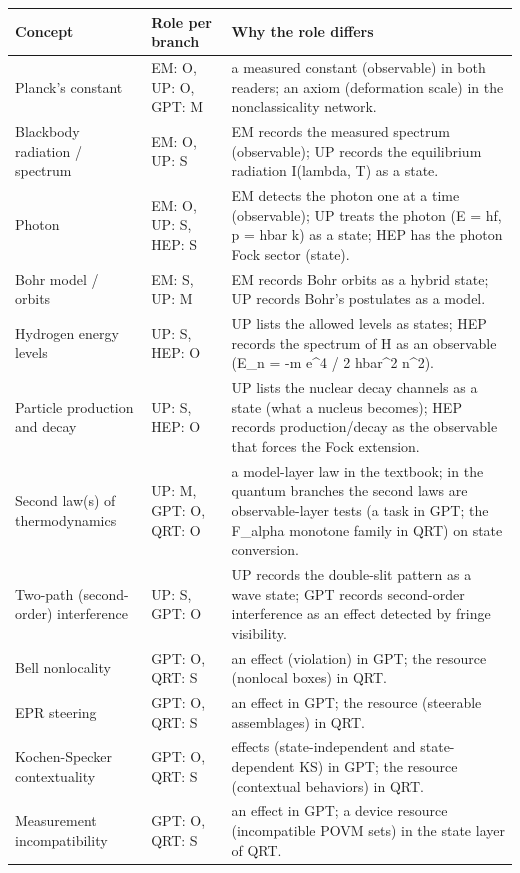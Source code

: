 \begin{longtable}{@{}p{3.2cm}p{3.0cm}p{8.4cm}@{}}\toprule
Concept & Role per branch & Why the role differs \\\midrule\endhead
Planck's constant & EM: O, UP: O, GPT: M & a measured constant (observable) in both readers; an axiom (deformation scale) in the nonclassicality network. \\
Blackbody radiation / spectrum & EM: O, UP: S & EM records the measured spectrum (observable); UP records the equilibrium radiation I(lambda, T) as a state. \\
Photon & EM: O, UP: S, HEP: S & EM detects the photon one at a time (observable); UP treats the photon (E = hf, p = hbar k) as a state; HEP has the photon Fock sector (state). \\
Bohr model / orbits & EM: S, UP: M & EM records Bohr orbits as a hybrid state; UP records Bohr's postulates as a model. \\
Hydrogen energy levels & UP: S, HEP: O & UP lists the allowed levels as states; HEP records the spectrum of H as an observable (E\_n = -m e\^{}4 / 2 hbar\^{}2 n\^{}2). \\
Particle production and decay & UP: S, HEP: O & UP lists the nuclear decay channels as a state (what a nucleus becomes); HEP records production/decay as the observable that forces the Fock extension. \\
Second law(s) of thermodynamics & UP: M, GPT: O, QRT: O & a model-layer law in the textbook; in the quantum branches the second laws are observable-layer tests (a task in GPT; the F\_alpha monotone family in QRT) on state conversion. \\
Two-path (second-order) interference & UP: S, GPT: O & UP records the double-slit pattern as a wave state; GPT records second-order interference as an effect detected by fringe visibility. \\
Bell nonlocality & GPT: O, QRT: S & an effect (violation) in GPT; the resource (nonlocal boxes) in QRT. \\
EPR steering & GPT: O, QRT: S & an effect in GPT; the resource (steerable assemblages) in QRT. \\
Kochen-Specker contextuality & GPT: O, QRT: S & effects (state-independent and state-dependent KS) in GPT; the resource (contextual behaviors) in QRT. \\
Measurement incompatibility & GPT: O, QRT: S & an effect in GPT; a device resource (incompatible POVM sets) in the state layer of QRT. \\

\end{longtable}
